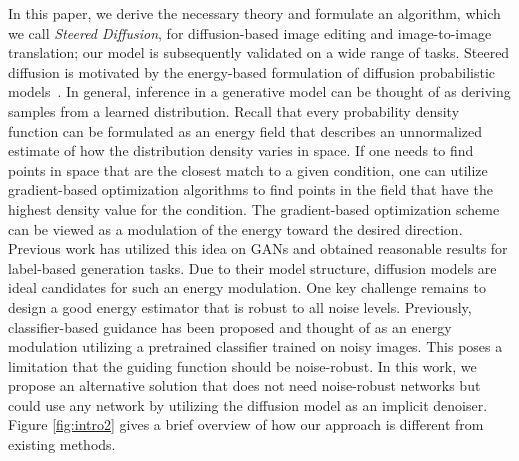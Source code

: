 \documentclass[10pt,twocolumn,letterpaper]{article}
\begin{document}
  In this paper, we derive the necessary theory and formulate an algorithm, which we call \emph{Steered Diffusion}, for diffusion-based image editing and image-to-image translation; our model is subsequently validated on a wide range of tasks. Steered diffusion is motivated by the energy-based formulation of diffusion probabilistic models~\cite{gao2020learning}. In general, inference in a generative model can be thought of as deriving samples from a learned distribution. Recall that every probability density function can be formulated as an energy field that describes an unnormalized estimate of how the distribution density varies in space\cite{grathwohl2019your, nguyen2017plug}. 
  If one needs to find points in space that are the closest match to a given condition,  one can utilize gradient-based optimization algorithms to find points in the field that have the highest density value for the condition. The gradient-based optimization scheme can be viewed as a modulation of the energy toward the desired direction. Previous work has utilized this idea on GANs\cite{nguyen2017plug,nguyen2016synthesizing} and obtained reasonable results for label-based generation tasks. Due to their model structure, diffusion models are ideal candidates for such an energy modulation. One key challenge remains to design a good energy estimator that is robust to all noise levels. Previously, classifier-based guidance \cite{nichol2021glide,dhariwal2021diffusion} has been proposed and thought of as an energy modulation utilizing a pretrained classifier trained on noisy images. This poses a limitation that the guiding function should be noise-robust. In this work, we propose an alternative solution that does not need noise-robust networks but could use any network by utilizing the diffusion model as an implicit denoiser. Figure \ref{fig:intro2} gives a brief overview of how our approach is different from existing methods.
  
\end{document}
